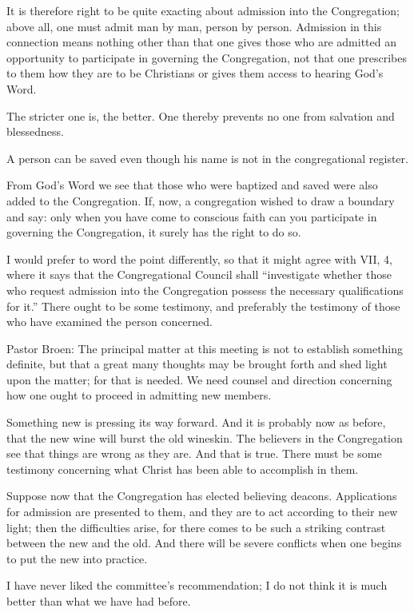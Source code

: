 It is therefore right to be quite exacting about admission into the Congregation; above all, one must admit man by man, person by person. Admission in this connection means nothing other than that one gives those who are admitted an opportunity to participate in governing the Congregation, not that one prescribes to them how they are to be Christians or gives them access to hearing God’s Word.

The stricter one is, the better. One thereby prevents no one from salvation and blessedness.

A person can be saved even though his name is not in the congregational register.

From God’s Word we see that those who were baptized and saved were also added to the Congregation. If, now, a congregation wished to draw a boundary and say: only when you have come to conscious faith can you participate in governing the Congregation, it surely has the right to do so.

I would prefer to word the point differently, so that it might agree with VII, 4, where it says that the Congregational Council shall “investigate whether those who request admission into the Congregation possess the necessary qualifications for it.” There ought to be some testimony, and preferably the testimony of those who have examined the person concerned.

Pastor Broen: The principal matter at this meeting is not to establish something definite, but that a great many thoughts may be brought forth and shed light upon the matter; for that is needed. We need counsel and direction concerning how one ought to proceed in admitting new members.

Something new is pressing its way forward. And it is probably now as before, that the new wine will burst the old wineskin. The believers in the Congregation see that things are wrong as they are. And that is true. There must be some testimony concerning what Christ has been able to accomplish in them.

Suppose now that the Congregation has elected believing deacons. Applications for admission are presented to them, and they are to act according to their new light; then the difficulties arise, for there comes to be such a striking contrast between the new and the old. And there will be severe conflicts when one begins to put the new into practice.

I have never liked the committee’s recommendation; I do not think it is much better than what we have had before.


